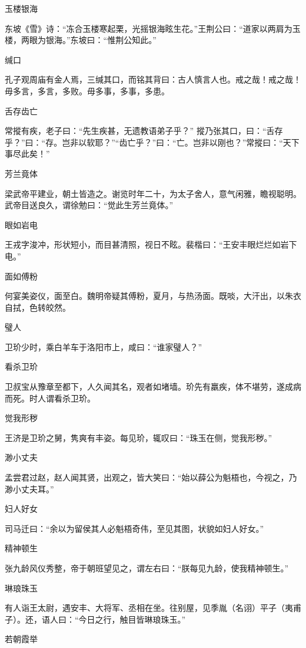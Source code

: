 \documentclass[a4paper,12pt,UTF8,twoside]{ctexbook}
\begin{document}
    玉楼银海
    
    东坡《雪》诗：“冻合玉楼寒起栗，光摇银海眩生花。”王荆公曰：“道家以两肩为玉楼，两眼为银海。”东坡曰：“惟荆公知此。”
    
    缄口
    
    孔子观周庙有金人焉，三缄其口，而铭其背曰：古人慎言人也。戒之哉！戒之哉！毋多言，多言，多败。毋多事，多事，多患。
    
    舌存齿亡
    
    常摐有疾，老子曰：“先生疾甚，无遗教语弟子乎？” 摐乃张其口，曰：“舌存乎？”曰：“存。岂非以软耶？”“齿亡乎？”曰：“亡。岂非以刚也？”常摐曰：“天下事尽此矣！”
    
    芳兰竟体
    
    梁武帝平建业，朝土皆造之。谢览时年二十，为太子舍人，意气闲雅，瞻视聪明。武帝目送良久，谓徐勉曰：“觉此生芳兰竟体。”
    
    眼如岩电
    
    王戎字浚冲，形状短小，而目甚清照，视日不眩。裴楷曰：“王安丰眼烂烂如岩下电。”
    
    面如傅粉
    
    何宴美姿仪，面至白。魏明帝疑其傅粉，夏月，与热汤面。既啖，大汗出，以朱衣自拭，色转皎然。
    
    璧人
    
    卫玠少时，乘白羊车于洛阳市上，咸曰：“谁家璧人？”
    
    看杀卫玠
    
    卫叔宝从豫章至都下，人久闻其名，观者如堵墙。玠先有羸疾，体不堪劳，遂成病而死。时人谓看杀卫玠。
    
    觉我形秽
    
    王济是卫玠之舅，隽爽有丰姿。每见玠，辄叹曰：“珠玉在侧，觉我形秽。”
    
    渺小丈夫
    
    孟尝君过赵，赵人闻其贤，出观之，皆大笑曰：“始以薛公为魁梧也，今视之，乃渺小丈夫耳。”
    
    妇人好女
    
    司马迁曰：“余以为留侯其人必魁梧奇伟，至见其图，状貌如妇人好女。”
    
    精神顿生
    
    张九龄风仪秀整，帝于朝班望见之，谓左右曰：“朕每见九龄，使我精神顿生。”
    
    琳琅珠玉
    
    有人诣王太尉，遇安丰、大将军、丞相在坐。往别屋，见季胤（名诩）平子（夷甫子）。还，语人曰：“今日之行，触目皆琳琅珠玉。”
    
    若朝霞举
    
\end{document}
